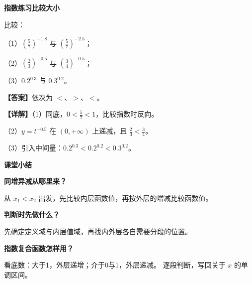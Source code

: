\documentclass[UTF8,10pt,aspectratio=169]{ctexbeamer}
\newcommand{\PageHeading}[1]{\begin{center}{\Large\bfseries #1}\end{center}\vspace{0.2cm}}
\newcommand{\Answer}[1]{\par\vspace{0.2cm}\textbf{【答案】}#1}
\newcommand{\Analysis}[1]{\par\vspace{0.2cm}\textbf{【详解】}#1}
\begin{document}
\begin{frame}[t,label=F21]
  \PageHeading{指数练习\quad 比较大小}
  比较：
  \par（1）$\left(\frac57\right)^{-1.8}$ 与 $\left(\frac57\right)^{-2.5}$；
  \par（2）$\left(\frac23\right)^{-0.5}$ 与 $\left(\frac34\right)^{-0.5}$；
  \par（3）$0.2^{0.3}$ 与 $0.3^{0.2}$。
  \pause
  \Answer{依次为 $<$、$>$、$<$。}
  \Analysis{（1）同底，$0<\frac57<1$，比较指数时反向。
  \par（2）$y=t^{-0.5}$ 在 $(0,+\infty)$ 上递减，且 $\frac23<\frac34$。
  \par（3）引入中间量：$0.2^{0.3}<0.2^{0.2}<0.3^{0.2}$。}
\end{frame}

\begin{frame}[t,label=F24]
  \PageHeading{课堂小结}
  \textbf{同增异减从哪里来？}\par
  从 $x_1<x_2$ 出发，先比较内层函数值，再按外层的增减比较函数值。
  \par\vspace{0.3cm}
  \textbf{判断时先做什么？}\par
  先确定定义域与内层值域，再找内外层各自需要分段的位置。
  \pause
  \par\vspace{0.3cm}
  \textbf{指数复合函数怎样用？}\par
  看底数：大于1，外层递增；介于0与1，外层递减。
  逐段判断，写回关于 $x$ 的单调区间。
\end{frame}
\end{document}

